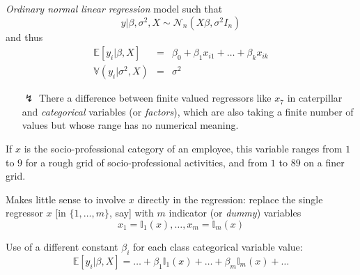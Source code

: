 \begin{slide}

\textit{Ordinary normal linear regression} model such that
$$
y|\beta,\sigma^2,X\sim\mathscr{N}_n(X\beta,\sigma^2I_n)
$$
\pause
and thus
\begin{eqnarray*}
\mathbb{E}[y_i|\beta,X]    &=& \beta_0+\beta_1x_{i1}+\ldots+\beta_kx_{ik}\\
\mathbb{V}(y_i|\sigma^2,X) &=& \sigma^2
\end{eqnarray*}

\end{slide}\begin{slide}

\begin{itemize}
\item[{\Large $\lightning$}]
There  a difference between finite valued regressors like $x_7$ in {\sf caterpillar} 
 and
{\em categorical} variables (or {\em factors}), which are also taking a finite number of values
but whose range has no numerical meaning.
\end{itemize}

\pause
\begin{example}
If $x$ is the socio-professional category of an employee, this variable ranges from $1$ to $9$ 
for a rough grid of socio-professional activities, and from $1$ to $89$ on a finer grid. 

\end{example}

\end{slide}\begin{slide}

Makes little sense to involve $x$ directly in the regression: replace the single regressor $x$ [in
$\{1,\ldots,m\}$, say] with $m$ indicator (or {\em dummy}) variables 
$$
x_1=\mathbb{I}_1(x), \ldots, x_m=\mathbb{I}_m(x)
$$

\pause
\begin{block}{}
Use of a different constant $\beta_i$ for each class categorical variable value:
$$
\mathbb{E}[y_i|\beta,X] = \ldots + \beta_1\mathbb{I}_1(x)+\ldots+\beta_m\mathbb{I}_m(x)+\ldots
$$
\end{block}

\end{slide}\begin{slide}


\end{slide}

